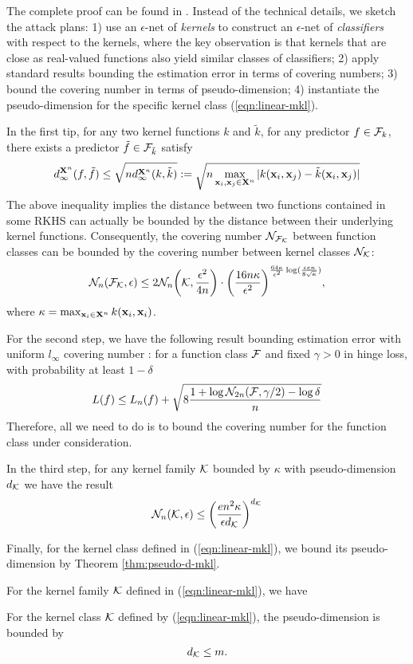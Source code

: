 The complete proof can be found in \cite{colt/SrebroB06}. Instead of the technical
details, we sketch the attack plans: 1) use an $\epsilon$-net of {\em kernels} to
construct an $\epsilon$-net of {\em classifiers} with respect to the kernels, where the
key observation is that kernels that are close as real-valued functions also yield similar
classes of classifiers; 2) apply standard results bounding the estimation error in terms of
covering numbers; 3) bound the covering number  in terms of pseudo-dimension; 4)
instantiate the pseudo-dimension for the specific kernel class (\ref{eqn:linear-mkl}).

In the first tip, for any two kernel functions $k$ and $\tilde{k}$, for any predictor $f
\in {\cal F}_k$, there exists a predictor $\tilde{f} \in {\cal F}_{\tilde{k}}$ satisfy
\[
d_\infty^{\mathbf X^n}(f, \tilde{f}) \leq \sqrt{nd^{\mathbf X^n}_\infty(k, \tilde{k})} := \sqrt{ n\max_{\mathbf{x}_i, \mathbf{x}_j \in \mathbf X^n}| k(\mathbf{x}_i, \mathbf{x}_j) - \tilde{k}(\mathbf{x}_i, \mathbf{x}_j) |}
\]
The above inequality implies the distance between two functions contained in some
RKHS can actually be bounded by the distance between their underlying kernel
functions. Consequently, the covering number $\mathcal N_{{\cal F}_{\cal K}}$ between function
classes can be bounded by the covering number between kernel classes $\mathcal
N_{{\cal K}}$:
\[
\mathcal N_n({\cal F}_{\cal K}, \epsilon) \leq 2\mathcal N_n\bigg({\cal K}, \frac{\epsilon^2}{4n}\bigg)\cdot\bigg(\frac{16n\kappa}{\epsilon^2}\bigg)
^{\frac{64\kappa}{\epsilon^2}\log(\frac{\epsilon e n}{8\sqrt{\kappa}})},
\]
where $\kappa = \max_{\mathbf{x}_i \in \mathbf X^n} k(\mathbf{x}_i, \mathbf{x}_i)$.

For the second step, we have the following result bounding estimation error with
uniform $l_\infty$ covering number \cite{Anthony99}: for a function class ${\cal F}$ and
fixed $\gamma > 0$ in hinge loss, with probability at least $1 - \delta$
\[
L(f) \leq L_n(f) + \sqrt{8\frac{1 + \log\mathcal N_{2n}({\cal F}, \gamma / 2) - \log \delta}{n}}
\]
Therefore, all we need to do is to bound the covering number for the function class
under consideration.

In the third step, for any kernel family ${\cal K}$ bounded by $\kappa$ with
pseudo-dimension $d_{\cal K}$ we have the result
\[
\mathcal N_n({\cal K}, \epsilon) \leq \bigg(\frac{en^2\kappa}{\epsilon d_{\cal K}}\bigg)^{d_{\cal K}}
\]

Finally, for the kernel class defined in (\ref{eqn:linear-mkl}), we bound its
pseudo-dimension by Theorem \ref{thm:pseudo-d-mkl}.

For the kernel family ${\cal K}$ defined in (\ref{eqn:linear-mkl}), we have
\begin{theorem} \label{thm:pseudo-d-mkl}
For the kernel class ${\cal K}$ defined by (\ref{eqn:linear-mkl}), the pseudo-dimension is
bounded by
\[
d_{\cal K} \leq m.
\]
\end{theorem}

